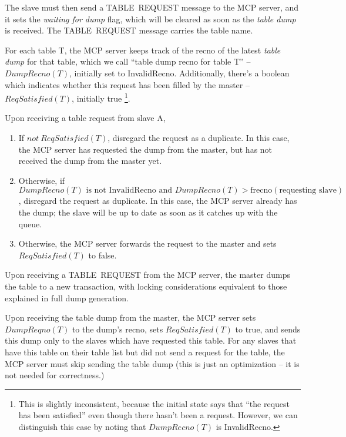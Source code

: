 \documentclass{article}
\newcommand{\tabdump}{\emph{table dump}}
\begin{document}
The slave must then send a TABLE~REQUEST message to the MCP server,
and it sets the \emph{waiting for dump} flag,
which will be cleared as soon as the \tabdump{} is received.
The TABLE~REQUEST message carries the table name.

For each table T,
the MCP server keeps track of
the recno of the latest \tabdump{} for that table,
which we call ``table dump recno for table T'' -- $ DumpRecno(T) $,
initially set to InvalidRecno.
Additionally, there's a boolean which indicates
whether this request has been filled by the master
-- $ ReqSatisfied(T) $,
initially true%
\footnote{This is slightly inconsistent,
because the initial state says that ``the request has been satisfied''
even though there hasn't been a request.
However,
we can distinguish this case by noting that
$DumpRecno(T)$ is InvalidRecno.}.

Upon receiving a table request from slave A,

\begin{enumerate}

\item If $ not\ ReqSatisfied(T) $,
disregard the request as a duplicate.
In this case,
the MCP server has requested the dump from the master,
but has not received the dump from the master yet.

\item Otherwise, if
$ DumpRecno(T)\textrm{ is not InvalidRecno and }DumpRecno(T) > \textrm{frecno}(\textrm{requesting slave}) $,
disregard the request as duplicate.
In this case, the MCP server already has the dump;
the slave will be up to date as soon as it catches up with the queue.

\item Otherwise,
the MCP server
forwards the request to the master
and sets $ ReqSatisfied(T) $ to false.

\end{enumerate}

Upon receiving a TABLE~REQUEST from the MCP server,
the master dumps the table to a new transaction,
with locking considerations equivalent to those explained
in full dump generation.

Upon receiving the table dump from the master, the MCP server
sets $ DumpReqno(T) $ to the dump's recno,
sets $ ReqSatisfied(T) $ to true,
and sends this dump only to the slaves
which have requested this table.
For any slaves that have this table on their table list
but did not send a request for the table,
the MCP server must skip sending the table dump
(this is just an optimization -- it is not needed for correctness.)
\end{document}
